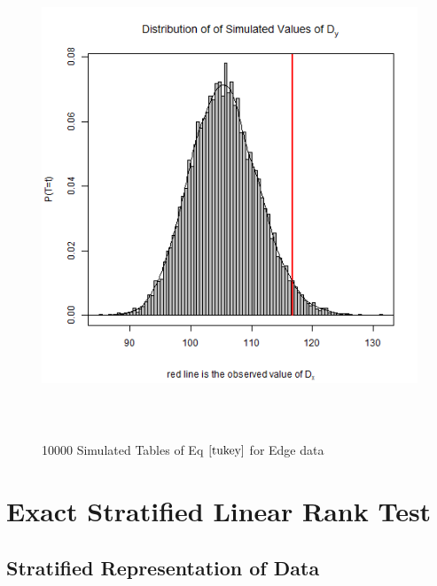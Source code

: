\documentclass[12pt,oneside]{report}
\theoremstyle{definition}
\theoremstyle{mystyle}
\begin{document}
\begin{figure}[h!]
	\label{p4}
	\begin{center}
		\includegraphics*[height=5in]{gfch.png}\
	\end{center}
	\vspace{-0.3in}
	\caption{10000 Simulated Tables of  Eq $\ref{tukey}$ for Edge data}
	\label{fig:gull}
\end{figure}






\chapter{Exact Stratified Linear Rank Test}

\section{Stratified Representation of Data}
\end{document}
